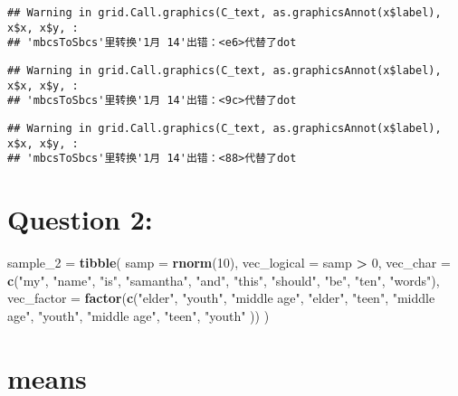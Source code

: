 \documentclass[
]{article}
\newenvironment{Shaded}{\begin{snugshade}}{\end{snugshade}}
\newcommand{\AttributeTok}[1]{\textcolor[rgb]{0.13,0.29,0.53}{#1}}
\newcommand{\DecValTok}[1]{\textcolor[rgb]{0.00,0.00,0.81}{#1}}
\newcommand{\FunctionTok}[1]{\textcolor[rgb]{0.13,0.29,0.53}{\textbf{#1}}}
\newcommand{\NormalTok}[1]{#1}
\newcommand{\OtherTok}[1]{\textcolor[rgb]{0.56,0.35,0.01}{#1}}
\newcommand{\SpecialCharTok}[1]{\textcolor[rgb]{0.81,0.36,0.00}{\textbf{#1}}}
\newcommand{\StringTok}[1]{\textcolor[rgb]{0.31,0.60,0.02}{#1}}
\begin{document}
\begin{verbatim}
## Warning in grid.Call.graphics(C_text, as.graphicsAnnot(x$label), x$x, x$y, :
## 'mbcsToSbcs'里转换'1月 14'出错：<e6>代替了dot
\end{verbatim}

\begin{verbatim}
## Warning in grid.Call.graphics(C_text, as.graphicsAnnot(x$label), x$x, x$y, :
## 'mbcsToSbcs'里转换'1月 14'出错：<9c>代替了dot
\end{verbatim}

\begin{verbatim}
## Warning in grid.Call.graphics(C_text, as.graphicsAnnot(x$label), x$x, x$y, :
## 'mbcsToSbcs'里转换'1月 14'出错：<88>代替了dot
\end{verbatim}

\hypertarget{question-2}{%
\section{Question 2:}\label{question-2}}

\begin{Shaded}
\begin{Highlighting}[]
\NormalTok{sample\_2 }\OtherTok{=} \FunctionTok{tibble}\NormalTok{(}
  \AttributeTok{samp =} \FunctionTok{rnorm}\NormalTok{(}\DecValTok{10}\NormalTok{),}
  \AttributeTok{vec\_logical =}\NormalTok{ samp }\SpecialCharTok{\textgreater{}} \DecValTok{0}\NormalTok{,}
  \AttributeTok{vec\_char =} \FunctionTok{c}\NormalTok{(}\StringTok{"my"}\NormalTok{, }\StringTok{"name"}\NormalTok{, }\StringTok{"is"}\NormalTok{, }\StringTok{"samantha"}\NormalTok{, }\StringTok{"and"}\NormalTok{, }\StringTok{"this"}\NormalTok{, }\StringTok{"should"}\NormalTok{, }\StringTok{"be"}\NormalTok{, }\StringTok{"ten"}\NormalTok{, }\StringTok{"words"}\NormalTok{),}
  \AttributeTok{vec\_factor =} \FunctionTok{factor}\NormalTok{(}\FunctionTok{c}\NormalTok{(}\StringTok{"elder"}\NormalTok{, }\StringTok{"youth"}\NormalTok{, }\StringTok{"middle age"}\NormalTok{, }\StringTok{"elder"}\NormalTok{, }\StringTok{"teen"}\NormalTok{, }\StringTok{"middle age"}\NormalTok{, }\StringTok{"youth"}\NormalTok{, }\StringTok{"middle age"}\NormalTok{, }\StringTok{"teen"}\NormalTok{, }\StringTok{"youth"}\NormalTok{ ))}
\NormalTok{  )}
\end{Highlighting}
\end{Shaded}

\hypertarget{means}{%
\section{means}\label{means}}
\end{document}

